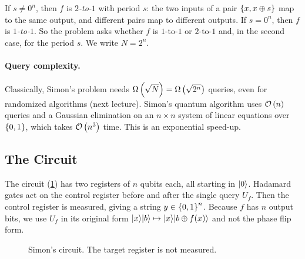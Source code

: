 If $s \neq 0^n$, then $f$ is \emph{$2$-to-$1$} with period $s$: the two inputs of a pair
$\left\lbrace x, x \oplus s\right\rbrace$ map to the same output, and different pairs map to different outputs. If
$s = 0^n$, then $f$ is \emph{$1$-to-$1$}. So the problem asks whether $f$ is $1$-to-$1$ or $2$-to-$1$
and, in the second case, for the period $s$. We write $N = 2^n$.

\paragraph{Query complexity.} Classically, Simon's problem needs $\Omega\left(\sqrt{N}\right) = \Omega\left(\sqrt{2^n}\right)$
queries, even for randomized algorithms (next lecture). Simon's quantum algorithm uses $\mathcal{O}\left(n\right)$
queries and a Gaussian elimination on an $n \times n$ system of linear equations over $\left\lbrace0,1\right\rbrace$,
which takes $\mathcal{O}\left(n^3\right)$ time. This is an exponential speed-up.

\subsection{The Circuit}

The circuit (\cref{fig:simon-0929}) has two registers of $n$ qubits each, all starting in $\lvert 0 \rangle$.
Hadamard gates act on the control register before and after the single query $U_f$. Then the control
register is measured, giving a string $y \in \left\lbrace0,1\right\rbrace^n$. Because $f$ has $n$ output bits, we use
$U_f$ in its original form $\lvert x \rangle\lvert b \rangle \mapsto \lvert x \rangle\lvert b \oplus f(x) \rangle$ and not the phase flip
form.

\begin{figure}[ht]
    \centering
    \caption{Simon's circuit. The target register is not measured.}
    \label{fig:simon-0929}
\end{figure}

